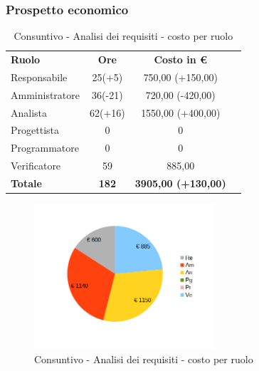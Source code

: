 \newpage
\subsubsection{Prospetto economico}


\begin{table} [h!]
	\begin{center}
		\begin{tabular} { m{3 cm} c c c  }
			\rowcolor{lightgray}
			\textbf{Ruolo} & \textbf{Ore} & \textbf{Costo in \euro} \\
			Responsabile & 25(+5) & 750,00 (+150,00) \\
			Amministratore & 36(-21) & 720,00 (-420,00)  \\
			Analista & 62(+16) & 1550,00 (+400,00) \\
			Progettista & 0 & 0 \\
			Programmatore & 0 & 0  \\
			Verificatore & 59 & 885,00  \\
			\textbf{Totale} & \textbf{182}  & \textbf{3905,00 (+130,00)} \\
			
		\end{tabular}
		\caption{Consuntivo - Analisi dei requisiti - costo per ruolo}
	\end{center}
\end{table}

\begin{figure} [h!]
	\centering
	\includegraphics[width=0.6\textwidth]{res/img/grafici/consuntivo- torta_ costo_per_ora- analisi dei requisiti.png}
	\caption{Consuntivo - Analisi dei requisiti - costo per ruolo} 
\end{figure}

\newpage 

